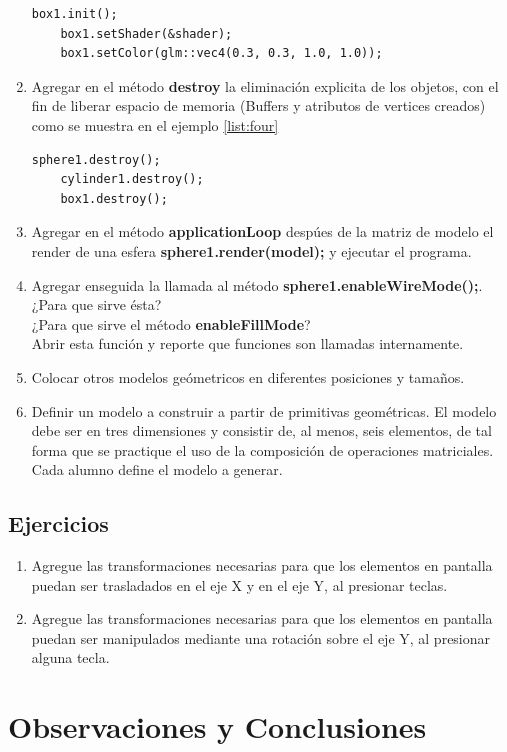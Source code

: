 \documentclass[11pt, english]{article}
\begin{document}
\begin{enumerate}
\begin{lstlisting}[label={list:third},caption={Inicialización de esfera, cylindro y caja.}, style=customc]
	box1.init();
	box1.setShader(&shader);
	box1.setColor(glm::vec4(0.3, 0.3, 1.0, 1.0));
\end{lstlisting}
\item Agregar en el método \textbf{destroy} la eliminación explicita de los objetos, con el fin de liberar espacio de memoria (Buffers y atributos de vertices creados) como se muestra en el ejemplo \ref{list:four}
\begin{lstlisting}[label={list:third},caption={Inicialización de esfera, cylindro y caja.}, style=customc]
	sphere1.destroy();
	cylinder1.destroy();
	box1.destroy();
\end{lstlisting}
\item Agregar en el método \textbf{applicationLoop} despúes de la matriz de modelo el render de una esfera \textbf{sphere1.render(model);} y ejecutar el programa.
\item Agregar enseguida la llamada al método \textbf{sphere1.enableWireMode();}.\\
¿Para que sirve ésta?\\
¿Para que sirve el método \textbf{enableFillMode}?\\
Abrir esta función y reporte que funciones son llamadas internamente. 
\item Colocar otros modelos geómetricos en diferentes posiciones y tamaños.
\item Definir un modelo a construir a partir de primitivas geométricas. El modelo debe
ser en tres dimensiones y consistir de, al menos, seis elementos, de tal forma que
se practique el uso de la composición de operaciones matriciales. Cada alumno
define el modelo a generar.
\end{enumerate}

\subsection{Ejercicios}
\begin{enumerate}
\item Agregue las transformaciones necesarias para que los elementos en pantalla
puedan ser trasladados en el eje X y en el eje Y, al presionar teclas.
\item Agregue las transformaciones necesarias para que los elementos en pantalla
puedan ser manipulados mediante una rotación sobre el eje Y, al presionar alguna
tecla.
\end{enumerate}
\section{Observaciones y Conclusiones}
\end{document}
